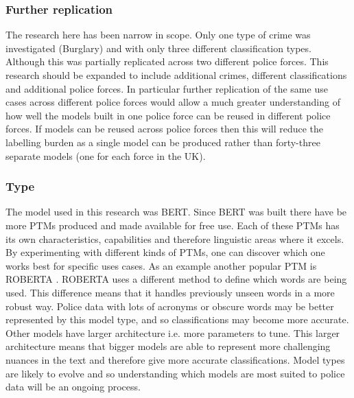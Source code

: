 \subsubsection{Further replication} The research here has been narrow in scope. Only one type of crime was investigated (Burglary) and with only three different classification types. Although this was partially replicated across two different police forces.  This research should be expanded to include additional crimes, different classifications and additional police forces. In particular further replication of the same use cases across different police forces would allow a much greater understanding of how well the models built in one police force can be reused in different police forces. If models can be reused across police forces then this will reduce the labelling burden as a single model can be produced rather than forty-three separate models (one for each force in the UK). 

\subsubsection{Type} The model used in this research was BERT. Since BERT was built there have be more PTMs produced and made available for free use.  Each of these PTMs has its own characteristics, capabilities and therefore linguistic areas where it excels. By experimenting with different kinds of PTMs, one can discover which one works best for specific uses cases. As an example another popular PTM is ROBERTA \parencite{liu2019roberta}. ROBERTA uses a different method to define which words are being used. This difference means  that  it handles previously unseen words in a more robust way. Police data with lots of acronyms or obscure words may be better represented by this model type, and so classifications may become more accurate. Other models have larger architecture i.e. more parameters to tune. This larger architecture means that bigger models are able to represent more challenging nuances in the text and therefore give more accurate classifications.  Model types are likely to evolve and so understanding which models are most suited to police data will be an ongoing process.


